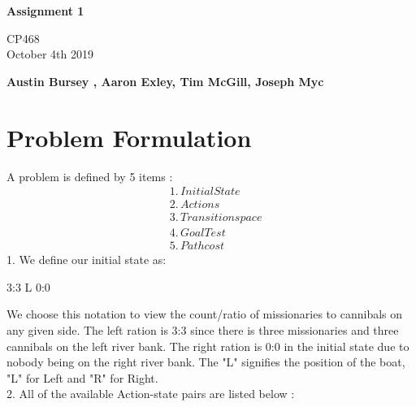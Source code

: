 \documentclass{article}
\begin{document}
\begin{titlepage}
  \pagestyle{fancy}
  \thispagestyle{fancy}
   \begin{center}
       \vspace*{1cm}
 
      \Huge
       \textbf{Assignment 1}
 
       \vspace{0.5cm}
       \Large
        CP468 \\ October 4th 2019
 
       \vspace{1.5cm}
 
       \textbf{Austin Bursey , Aaron Exley, Tim McGill, Joseph Myc}
 
       \vfill

 
       \vspace{0.8cm}
 
   \end{center}
\end{titlepage}
\setcounter{page}{2}
\section{Problem Formulation}
A problem is defined by 5 items : \\
\begin{align*}
&1.\, Initial State\\
&2.\, Actions\\
&3.\, Transition space \\
&4.\, Goal Test\\
&5.\, Path cost
\end{align*}	
1. We define our initial state as:  \\
\begin{center}
3:3 L 0:0\\
\end{center}

We choose this notation to view the count/ratio of missionaries to cannibals on any given side. The left ration is 3:3 since there is three missionaries and three cannibals on the left river bank. The right ration is 0:0 in the initial state due to nobody being on the right river bank. The "L" signifies the position of the boat, "L" for Left and "R" for Right.\\

2. All of the available Action-state pairs are listed below : 
\end{document}
